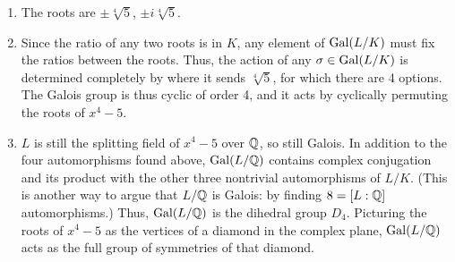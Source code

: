 \begin{solution}
\begin{enumerate}
    To show that $L$ is Galois, probably the easiest way is to do part (b), and observe that $L$ is the splitting field of $t^4 - 5$ over $K$, hence is Galois.
    \item The roots are $\pm \sqrt[4]{5}$, $\pm i \sqrt[4]{5}$.
    \item Since the ratio of any two roots is in $K$, any element of $\operatorname{Gal}(L/K)$ must fix the ratios between the roots. Thus, the action of any $\sigma \in \operatorname{Gal}(L/K)$ is determined completely by where it sends $\sqrt[4]{5}$, for which there are 4 options. The Galois group is thus cyclic of order 4, and it acts by cyclically permuting the roots of $x^4 - 5$.
    \item $L$ is still the splitting field of $x^4 - 5$ over $\mathbb{Q}$, so still Galois. In addition to the four automorphisms found above, $\operatorname{Gal}(L/\mathbb{Q})$ contains complex conjugation and its product with the other three nontrivial automorphisms of $L/K$. (This is another way to argue that $L/\mathbb{Q}$ is Galois: by finding $8 = [L:\mathbb{Q}]$ automorphisms.) Thus, $\operatorname{Gal}(L/\mathbb{Q})$ is the dihedral group $D_4$. Picturing the roots of $x^4 - 5$ as the vertices of a diamond in the complex plane, $\operatorname{Gal}(L/\mathbb{Q})$ acts as the full group of symmetries of that diamond.
\end{enumerate}
\end{solution}


